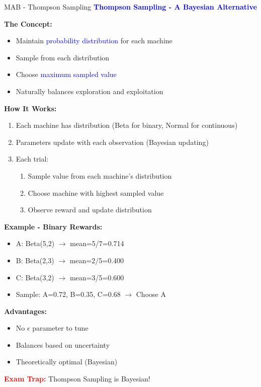 \documentclass[8pt]{beamer}
\begin{document}
	\begin{frame}{MAB - Thompson Sampling}
		\fontsize{6.5}{7.5}\selectfont
		\textcolor{blue}{\textbf{Thompson Sampling - A Bayesian Alternative}}
		
		\textbf{The Concept:}
		\begin{itemize}
			\item Maintain \textcolor{blue}{probability distribution} for each machine
			\item Sample from each distribution
			\item Choose \textcolor{blue}{maximum sampled value}
			\item Naturally balances exploration and exploitation
		\end{itemize}
		
		\textbf{How It Works:}
		\begin{enumerate}
			\item Each machine has distribution (Beta for binary, Normal for continuous)
			\item Parameters update with each observation (Bayesian updating)
			\item Each trial:
			\begin{enumerate}
				\item Sample value from each machine's distribution
				\item Choose machine with highest sampled value
				\item Observe reward and update distribution
			\end{enumerate}
		\end{enumerate}
		
		\textbf{Example - Binary Rewards:}
		\begin{itemize}
			\item A: Beta(5,2) $\rightarrow$ mean=5/7=0.714
			\item B: Beta(2,3) $\rightarrow$ mean=2/5=0.400
			\item C: Beta(3,2) $\rightarrow$ mean=3/5=0.600
			\item Sample: A=0.72, B=0.35, C=0.68 $\rightarrow$ Choose A
		\end{itemize}
		
		\textbf{Advantages:}
		\begin{itemize}
			\item No $\epsilon$ parameter to tune
			\item Balances based on uncertainty
			\item Theoretically optimal (Bayesian)
		\end{itemize}
		
		\textcolor{red}{\textbf{Exam Trap:}} Thompson Sampling is Bayesian!
	\end{frame}
	
\end{document}
